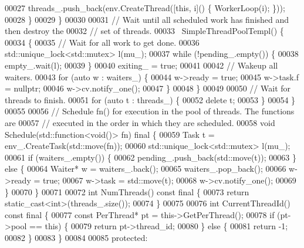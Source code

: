 \begin{DoxyCode}
00027       threads\_.push\_back(env.CreateThread([\textcolor{keyword}{this}, i]() \{ WorkerLoop(i); \}));
00028     \}
00029   \}
00030 
00031   \textcolor{comment}{// Wait until all scheduled work has finished and then destroy the}
00032   \textcolor{comment}{// set of threads.}
00033   ~SimpleThreadPoolTempl() \{
00034     \{
00035       \textcolor{comment}{// Wait for all work to get done.}
00036       std::unique\_lock<std::mutex> l(mu\_);
00037       \textcolor{keywordflow}{while} (!pending\_.empty()) \{
00038         empty\_.wait(l);
00039       \}
00040       exiting\_ = \textcolor{keyword}{true};
00041 
00042       \textcolor{comment}{// Wakeup all waiters.}
00043       \textcolor{keywordflow}{for} (\textcolor{keyword}{auto} w : waiters\_) \{
00044         w->ready = \textcolor{keyword}{true};
00045         w->task.f = \textcolor{keyword}{nullptr};
00046         w->cv.notify\_one();
00047       \}
00048     \}
00049 
00050     \textcolor{comment}{// Wait for threads to finish.}
00051     \textcolor{keywordflow}{for} (\textcolor{keyword}{auto} t : threads\_) \{
00052       \textcolor{keyword}{delete} t;
00053     \}
00054   \}
00055 
00056   \textcolor{comment}{// Schedule fn() for execution in the pool of threads. The functions are}
00057   \textcolor{comment}{// executed in the order in which they are scheduled.}
00058   \textcolor{keywordtype}{void} Schedule(std::function<\textcolor{keywordtype}{void}()> fn) \textcolor{keyword}{final} \{
00059     Task t = env\_.CreateTask(std::move(fn));
00060     std::unique\_lock<std::mutex> l(mu\_);
00061     \textcolor{keywordflow}{if} (waiters\_.empty()) \{
00062       pending\_.push\_back(std::move(t));
00063     \} \textcolor{keywordflow}{else} \{
00064       Waiter* w = waiters\_.back();
00065       waiters\_.pop\_back();
00066       w->ready = \textcolor{keyword}{true};
00067       w->task = std::move(t);
00068       w->cv.notify\_one();
00069     \}
00070   \}
00071 
00072   \textcolor{keywordtype}{int} NumThreads() const final \{
00073     \textcolor{keywordflow}{return} \textcolor{keyword}{static\_cast<}\textcolor{keywordtype}{int}\textcolor{keyword}{>}(threads\_.size());
00074   \}
00075 
00076   \textcolor{keywordtype}{int} CurrentThreadId() const final \{
00077     \textcolor{keyword}{const} PerThread* pt = this->GetPerThread();
00078     \textcolor{keywordflow}{if} (pt->pool == \textcolor{keyword}{this}) \{
00079       \textcolor{keywordflow}{return} pt->thread\_id;
00080     \} \textcolor{keywordflow}{else} \{
00081       \textcolor{keywordflow}{return} -1;
00082     \}
00083   \}
00084 
00085  \textcolor{keyword}{protected}:

\end{DoxyCode}
